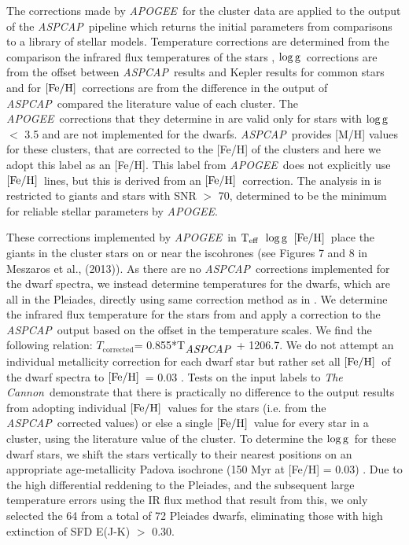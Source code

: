 \documentclass[12pt, preprint]{aastex}
\newcommand{\teff}{\mbox{$\rm T_{eff}$}}
\newcommand{\feh}{\mbox{$\rm [Fe/H]$}}
\newcommand{\logg}{\mbox{$\rm \log g$}}
\newcommand{\tc}{\textsl{The Cannon}}
\newcommand{\apogee}{\textsl{APOGEE}}
\newcommand{\aspcap}{\textsl{ASPCAP}}
\begin{document}
The corrections made by \apogee\ for the cluster data are applied to the output of the \aspcap\ pipeline which returns the initial parameters from comparisons to a library of stellar models. Temperature corrections are determined from the comparison the infrared flux temperatures of the stars \citep{Gonzalez2009}, \logg\ corrections are from the offset between \aspcap\ results and Kepler results for common stars and for \feh\ corrections are from the difference in the output of \aspcap\ compared the literature value of each cluster.  The \apogee\ corrections that they determine in \citet{Meszaros2013} are valid only for stars with \logg\ $<$ 3.5 and are not implemented for the dwarfs. \aspcap\ provides [M/H] values for these clusters, that are corrected to the [Fe/H] of the clusters and here we adopt this label as an [Fe/H]. This label from \apogee\ does not explicitly use \feh\ lines, but this is derived from an \feh\ correction. The analysis in \citet{Meszaros2013} is restricted to giants and stars with SNR $>$ 70, determined to be the minimum for reliable stellar parameters by \apogee.

These corrections implemented by \apogee\ in \teff\, \logg\, \feh\ place the giants in the cluster stars on or near the iscohrones (see Figures 7 and 8 in Meszaros et al., (2013)).  As there are no \aspcap\ corrections implemented for the dwarf spectra, we instead determine temperatures for the dwarfs, which are all in the Pleiades, directly using same correction method as in \citet{Meszaros2013}. We determine the infrared flux temperature for the stars from \citep{Gonzalez2009} and apply a correction to the \aspcap\ output based on the offset in the temperature scales. We find the following relation: $T_{\mbox{corrected}}$= 0.855*T$_{\mbox{\textit{ASPCAP}}}$ + 1206.7. We do not attempt an individual metallicity correction for each dwarf star but rather set all \feh\ of the dwarf spectra to \feh\ = 0.03 \citep{Barrado2001}. Tests on the input labels to \tc\ demonstrate that there is practically no difference to the output results from adopting individual \feh\ values for the stars (i.e. from the \aspcap\ corrected values) or else a single \feh\ value for every star in a cluster, using the literature value of the cluster. To determine the \logg\ for these dwarf stars, we shift the stars vertically to their nearest positions on an appropriate age-metallicity Padova isochrone (150 Myr at [Fe/H] = 0.03) \citep{Girardi2010}. Due to the high differential reddening to the Pleiades, and the subsequent large temperature errors using the IR flux method that result from this, we only selected the 64 from a total of 72 Pleiades dwarfs, eliminating those with high extinction of SFD E(J-K) $>$ 0.30.
\end{document}
